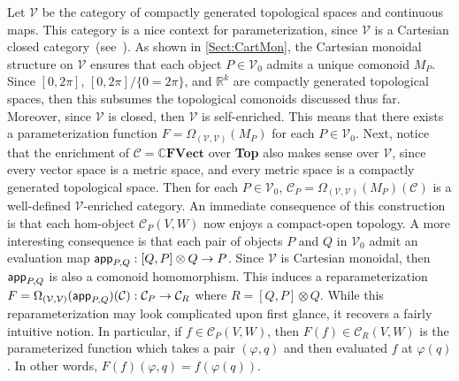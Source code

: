 \begin{exa}
    \label{Ex:NiceTop}
    Let $\mathcal{V}$ be the category of compactly generated topological spaces and continuous maps.
    This category is a nice context for parameterization, since $\mathcal{V}$ is a Cartesian closed category~(see~\cite{Steenrod1967}).
    As shown in \cref{Sect:CartMon}, the Cartesian monoidal structure on $\mathcal{V}$ ensures that each object $P \in \mathcal{V}_0$ admits a unique comonoid $M_P$.
    Since $[0,2\pi]$, $[0,2\pi] / \{ 0 = 2\pi \}$, and $\mathbb{R}^k$ are compactly generated topological spaces, then this subsumes the topological comonoids discussed thus far.
    Moreover, since $\mathcal{V}$ is closed, then $\mathcal{V}$ is self-enriched.
    This means that there exists a parameterization function $F = \Omega_{( \mathcal{V}, \mathcal{V} )}( M_P )$ for each $P \in \mathcal{V}_0$.
    Next, notice that the enrichment of $\mathcal{C} = \mathbb{C}\mathbf{FVect}$ over \textbf{Top} also makes sense over $\mathcal{V}$, since every vector space is a metric space, and every metric space is a compactly generated topological space.
    Then for each $P \in \mathcal{V}_0$, $\mathcal{C}_P = \Omega_{(\mathcal{V},\mathcal{V})}( M_P )( \mathcal{C} )$ is a well-defined $\mathcal{V}$-enriched category.
    An immediate consequence of this construction is that each hom-object $\mathcal{C}_P( V, W )$ now enjoys a compact-open topology.
    A more interesting consequence is that each pair of objects $P$ and $Q$ in $\mathcal{V}_0$ admit an evaluation map $\mathsf{app}_{P,Q}: [ Q, P ] \otimes Q \to P$.
    Since $\mathcal{V}$ is Cartesian monoidal, then $\mathsf{app}_{P,Q}$ is also a comonoid homomorphism.
    This induces a reparameterization $F = \Omega_{( \mathcal{V}, \mathcal{V} )}( \mathsf{app}_{P,Q} )( \mathcal{C} ): \mathcal{C}_P \to \mathcal{C}_R$ where $R = [ Q, P ] \otimes Q$.
    While this reparameterization may look complicated upon first glance, it recovers a fairly intuitive notion.
    In particular, if $f \in \mathcal{C}_P( V, W )$, then $F( f ) \in \mathcal{C}_R( V, W )$ is the parameterized function which takes a pair $( \varphi, q )$ and then evaluated $f$ at $\varphi( q )$.
    In other words, $F( f )( \varphi, q ) = f( \varphi( q ) )$.
\end{exa}

